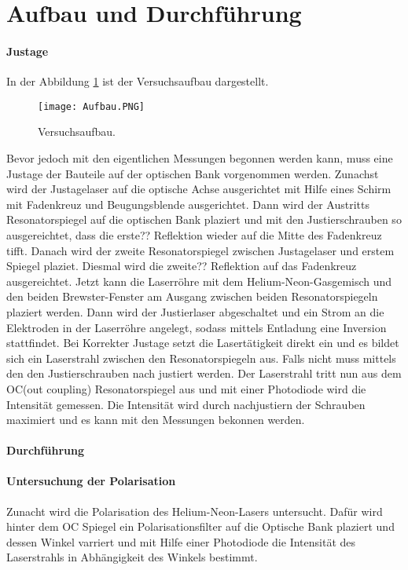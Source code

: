 \section{Aufbau und Durchführung}
\label{sec:Durchführung}
\paragraph{Justage}
In der Abbildung \ref{fig:aufbau} ist
der Versuchsaufbau dargestellt.
\begin{figure}
  \centering
  \texttt{[image: Aufbau.PNG]}
  \caption{Versuchsaufbau.}
  \label{fig:aufbau}
\end{figure}
Bevor jedoch mit den eigentlichen Messungen
begonnen werden
kann, muss eine Justage der Bauteile auf der optischen Bank vorgenommen werden.
Zunachst wird der Justagelaser auf die optische Achse
ausgerichtet
mit Hilfe eines Schirm mit Fadenkreuz und Beugungsblende
ausgerichtet.
Dann wird der Austritts Resonatorspiegel
auf die optischen Bank plaziert
und mit den Justierschrauben so ausgereichtet,
dass die erste?? Reflektion wieder auf die
Mitte des Fadenkreuz tifft.
Danach wird der
zweite Resonatorspiegel zwischen Justagelaser
und erstem Spiegel plaziet.
Diesmal wird die zweite?? Reflektion
auf das Fadenkreuz ausgereichtet.
Jetzt kann die Laserröhre mit dem Helium-Neon-Gasgemisch und
den beiden Brewster-Fenster am Ausgang
zwischen beiden Resonatorspiegeln
plaziert werden.
Dann wird der Justierlaser abgeschaltet
und ein Strom an die
Elektroden in der Laserröhre
angelegt, sodass mittels Entladung eine Inversion
stattfindet. Bei Korrekter
Justage setzt die Lasertätigkeit direkt ein
und es bildet sich ein Laserstrahl
zwischen den Resonatorspiegeln aus.
Falls nicht muss mittels den den Justierschrauben
nach justiert werden.
Der Laserstrahl tritt nun aus dem OC(out coupling) Resonatorspiegel
aus und mit einer Photodiode wird die Intensität gemessen.
Die Intensität wird durch nachjustiern der Schrauben maximiert und
es kann mit den Messungen bekonnen werden.



\paragraph{Durchführung}
\paragraph{ Untersuchung der Polarisation}
Zunacht wird die Polarisation des Helium-Neon-Lasers
untersucht. Dafür wird hinter dem OC Spiegel ein
Polarisationsfilter auf die Optische Bank
plaziert und dessen Winkel varriert und mit Hilfe einer Photodiode
die Intensität des Laserstrahls in Abhängigkeit des Winkels bestimmt.

